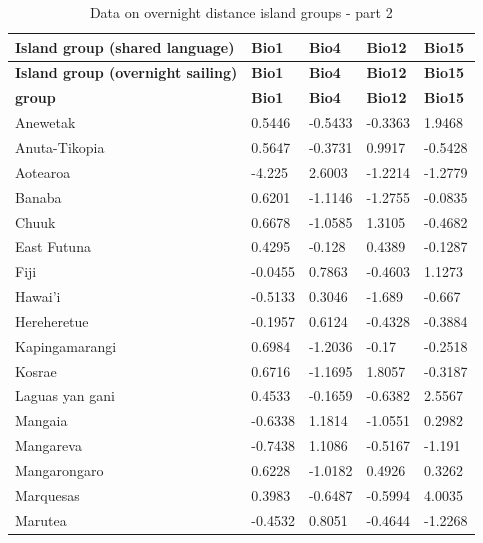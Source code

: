\documentclass[a4paper,10pt]{article} %
\begin{document}
\begin{landscape}
\begin{longtable}{| p{2.6cm} |  p{2cm} | p{2cm}  | p{2cm}  | p{2cm}|}

\caption{{Data on overnight distance island groups - part 2}} 
\label{overnight_groups_table_2} \\
\hline
\textbf{Island group (shared language)} & \textbf{Bio1} & \textbf{Bio4} & \textbf{Bio12} & \textbf{Bio15} \\ \hline

\endfirsthead

\hline
\textbf{Island group (overnight sailing)} & \textbf{Bio1} & \textbf{Bio4} & \textbf{Bio12} & \textbf{Bio15} \\ \hline
\endhead

\textbf{ group } & \textbf{ Bio1 } & \textbf{ Bio4 } & \textbf{ Bio12 } & \textbf{ Bio15 } \\ \hline
 Anewetak & 0.5446 & -0.5433 & -0.3363 & 1.9468 \\ \hline
 Anuta-Tikopia & 0.5647 & -0.3731 & 0.9917 & -0.5428 \\ \hline
 Aotearoa & -4.225 & 2.6003 & -1.2214 & -1.2779 \\ \hline
 Banaba & 0.6201 & -1.1146 & -1.2755 & -0.0835 \\ \hline
 Chuuk & 0.6678 & -1.0585 & 1.3105 & -0.4682 \\ \hline
 East Futuna & 0.4295 & -0.128 & 0.4389 & -0.1287 \\ \hline
 Fiji & -0.0455 & 0.7863 & -0.4603 & 1.1273 \\ \hline
 Hawai'i & -0.5133 & 0.3046 & -1.689 & -0.667 \\ \hline
 Hereheretue & -0.1957 & 0.6124 & -0.4328 & -0.3884 \\ \hline
 Kapingamarangi & 0.6984 & -1.2036 & -0.17 & -0.2518 \\ \hline
 Kosrae & 0.6716 & -1.1695 & 1.8057 & -0.3187 \\ \hline
 Laguas yan gani & 0.4533 & -0.1659 & -0.6382 & 2.5567 \\ \hline
 Mangaia & -0.6338 & 1.1814 & -1.0551 & 0.2982 \\ \hline
 Mangareva & -0.7438 & 1.1086 & -0.5167 & -1.191 \\ \hline
 Mangarongaro & 0.6228 & -1.0182 & 0.4926 & 0.3262 \\ \hline
 Marquesas & 0.3983 & -0.6487 & -0.5994 & 4.0035 \\ \hline
 Marutea & -0.4532 & 0.8051 & -0.4644 & -1.2268 \\ \hline

\end{longtable}
\end{landscape}
\end{document}
